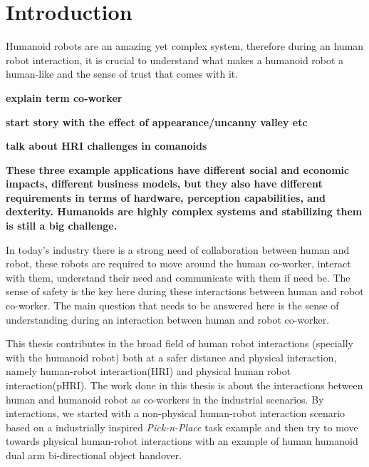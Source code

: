 {\color{blue}\chapter*{Introduction}}

Humanoid robots are an amazing yet complex system, therefore during an human robot interaction, it is crucial to understand what makes a humanoid robot a human-like and the sense of trust that comes with it.

\textbf{explain term co-worker}

\textbf{start story with the effect of appearance/uncanny valley etc}

\textbf{talk about HRI challenges in comanoids}

\textbf{These three example applications have different social and economic impacts, different business models, but they also have different requirements in terms of hardware, perception capabilities, and dexterity. Humanoids are highly complex systems and stabilizing them is still a big challenge.
}

In today's industry there is a strong need of collaboration between human and robot, these robots are required to move around the human co-worker, interact with them, understand their need and communicate with them if need be. The sense of safety is the key here during these interactions between human and robot co-worker. The main question that needs to be answered here is the sense of understanding during an interaction between human and robot co-worker.


This thesis contributes in the broad field of human robot interactions (specially with the humanoid robot) both at a safer distance and physical interaction, namely human-robot interaction(HRI) and physical human robot interaction(pHRI). The work done in this thesis is about the interactions between human and humanoid robot as co-workers in the industrial scenarios. By interactions, we started with a non-physical human-robot interaction scenario based on a industrially inspired \textit{Pick-n-Place} task example and then try to move towards physical human-robot interactions with an example of human humanoid dual arm bi-directional object handover.


